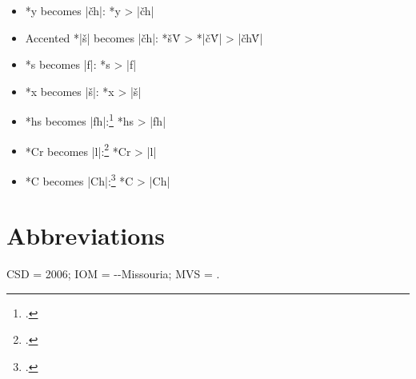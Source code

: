 \documentclass[output=paper]{LSP/langsci}
\begin{document}
\begin{itemize}
\item *y becomes |\v{c}h|: \hspace{5em} *y	>	|\v{c}h|
\item Accented *|š| becomes |\v{c}h|: \hspace{1em} *š\'V	>	*|\v{c}\'V|	>	|\v{c}h\'V|
\item *s becomes |f|: \hspace{6em} *s	>	|f|
\item *x becomes |š|: \hspace{6em} 	*x	>	|š|
\item *hs becomes |fh|:\footnote{\citealt[174, 299]{Rankinetal2006PDF}.}  \hspace{4.8em} 			*hs	>	|fh|
\item *Cr becomes |l|:\footnote{\citealt[90]{Rankinetal2006PDF}.}  \hspace{5em} 			*Cr	>	|l|
\item *C\textsuperscript{} becomes |Ch|:\footnote{\citealt[229, 232]{Rankinetal2006PDF}.}  \hspace{3.9em} *C\textsuperscript{}	>	|Ch|
\end{itemize}

\section*{Abbreviations}

CSD =  2006; IOM = --Missouria; MVS = .

 

\printbibliography[heading=subbibliography,notkeyword=this]
 
\end{document}
